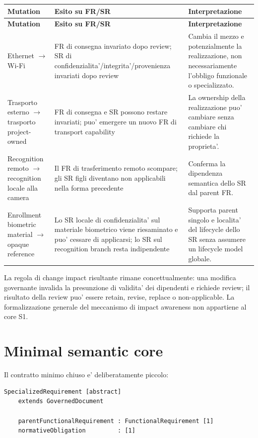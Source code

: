 \documentclass[11pt,a4paper]{article}
\begin{document}
\small
\begin{longtable}{p{}p{}p{}}
\toprule
\textbf{Mutation} & \textbf{Esito su FR/SR} & \textbf{Interpretazione} \\
\midrule
\endfirsthead
\toprule
\textbf{Mutation} & \textbf{Esito su FR/SR} & \textbf{Interpretazione} \\
\midrule
\endhead
Ethernet $\rightarrow$ Wi-Fi & FR di consegna invariato dopo review; SR di confidenzialita'/integrita'/provenienza invariati dopo review & Cambia il mezzo e potenzialmente la realizzazione, non necessariamente l'obbligo funzionale o specializzato. \\
\addlinespace
Trasporto esterno $\rightarrow$ trasporto project-owned & FR di consegna e SR possono restare invariati; puo' emergere un nuovo FR di transport capability & La ownership della realizzazione puo' cambiare senza cambiare chi richiede la proprieta'. \\
\addlinespace
Recognition remoto $\rightarrow$ recognition locale alla camera & Il FR di trasferimento remoto scompare; gli SR figli diventano non applicabili nella forma precedente & Conferma la dipendenza semantica dello SR dal parent FR. \\
\addlinespace
Enrollment biometric material $\rightarrow$ opaque reference & Lo SR locale di confidenzialita' sul materiale biometrico viene riesaminato e puo' cessare di applicarsi; lo SR sul recognition branch resta indipendente & Supporta parent singolo e localita' del lifecycle dello SR senza assumere un lifecycle model globale. \\
\bottomrule
\end{longtable}
\normalsize

La regola di change impact risultante rimane concettualmente: una modifica governante invalida la presunzione di validita' dei dipendenti e richiede review; il risultato della review puo' essere retain, revise, replace o non-applicable. La formalizzazione generale del meccanismo di impact awareness non appartiene al core S1.

\section{Minimal semantic core}

Il contratto minimo chiuso e' deliberatamente piccolo:

\begin{verbatim}
SpecializedRequirement [abstract]
    extends GovernedDocument

    parentFunctionalRequirement : FunctionalRequirement [1]
    normativeObligation         : [1]
\end{verbatim}
\end{document}
